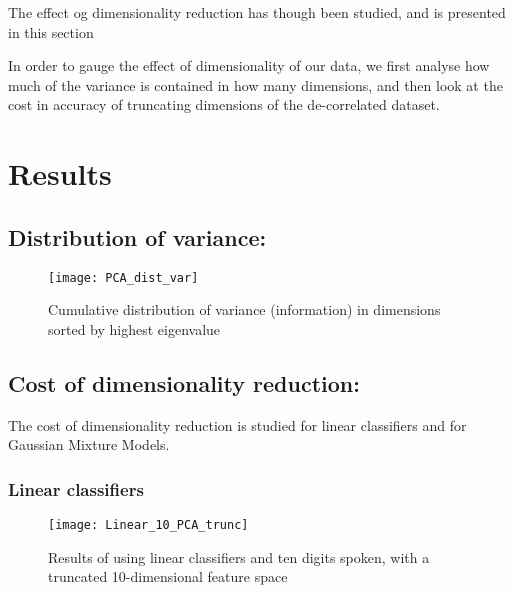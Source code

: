 The effect og dimensionality reduction has though been studied, and is presented in this section

In order to gauge the effect of dimensionality of our data, we first analyse how much of the variance is contained in how many dimensions, and then look at the cost in accuracy of truncating dimensions of the de-correlated dataset.


\section{Results}

\subsection{Distribution of variance:}

\begin{figure}[H]
\centering
\texttt{[image: PCA\_dist\_var]}
\caption{Cumulative distribution of variance (information) in dimensions sorted by highest eigenvalue}
\label{fig:PCA_dist}
\end{figure}

\subsection{Cost of dimensionality reduction:}
The cost of dimensionality reduction is studied for linear classifiers and for Gaussian Mixture Models.

\subsubsection{Linear classifiers}

\begin{figure}[H]
\centering
\texttt{[image: Linear\_10\_PCA\_trunc]}
\caption{Results of using linear classifiers and ten digits spoken, with a truncated 10-dimensional feature space}
\label{fig:PCA_lin_trunc}
\end{figure}


